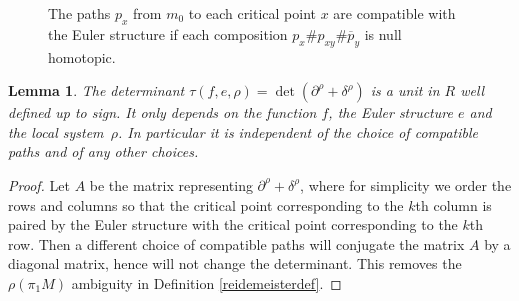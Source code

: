 \documentclass[11pt]{article}
\newcommand{\smaller}{\small}
\numberwithin{equation}{section}\providecommand{\dpl}{\displaystyle}
\theoremstyle{plain}
\newtheorem{lemma}[theorem]{Lemma}
\theoremstyle{definition}
\begin{document}
\begin{figure}[htbp]
\begin{center}
\caption{\smaller The paths $p_x$ from $m_0$ to each critical point $x$ are compatible with the Euler structure if each composition $p_x\# p_{xy}\# \overline p_y$ is null homotopic.}
\label{Fig: Euler}
\end{center}
\end{figure}

\begin{lemma}\label{indet}
The determinant $\tau(f,e,\rho)=\det(\partial^\rho + \delta^\rho)$ is a unit in $R$ well defined up to sign. It only depends on the function $f$, the Euler structure $e$ and the local system~$\rho$. In particular it is independent of the choice of compatible paths and of any other choices.
\end{lemma}

\begin{proof}
Let $A$ be the matrix representing $\partial^\rho + \delta^\rho$, where for simplicity we order the rows and columns so that the critical point corresponding to the $k$th column is paired by the Euler structure with the critical point corresponding to the $k$th row. Then a different choice of compatible paths will conjugate the matrix $A$ by a diagonal matrix, hence will not change the determinant. This removes the $\rho(\pi_1M)$ ambiguity in Definition \ref{reidemeisterdef}.
\end{proof}
\end{document}

